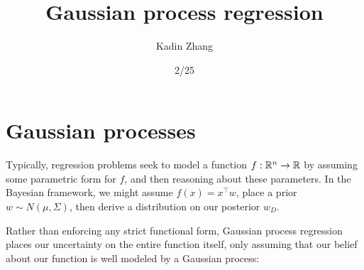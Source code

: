 \documentclass{article}
\title{Gaussian process regression}
\author{Kadin Zhang}
\date{2/25}
\begin{document}
\maketitle
{
\small
\setlength{\parindent}{0em}
\setlength{\parskip}{1em}
}


\section{Gaussian processes}
Typically, regression problems seek to model a function $f: \mathbb{R}^n \to  \mathbb{R} $ by assuming some parametric form for $f$, and then reasoning about these parameters. In the Bayesian framework, we might assume $f(x) = x^{\top} w$, place a prior $w \sim N(\mu , \Sigma )$, then derive a distribution on our posterior $w_D $. 

Rather than enforcing any strict functional form, Gaussian process regression places our uncertainty on the entire function itself, only assuming that our belief about our function is well modeled by a Gaussian process: 
\end{document}
